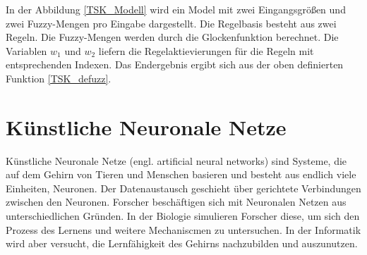 In der Abbildung \ref{TSK_Modell} wird ein Model mit zwei Eingangsgrößen und zwei Fuzzy-Mengen pro Eingabe dargestellt. Die Regelbasis besteht aus zwei Regeln. Die Fuzzy-Mengen werden durch die Glockenfunktion berechnet. Die Variablen $w_1$ und $w_2$ liefern die Regelaktievierungen für die Regeln mit entsprechenden Indexen. Das Endergebnis ergibt sich aus der oben definierten Funktion \ref{TSK_defuzz}.


%











\section{Künstliche Neuronale Netze} \label{ANN}

Künstliche Neuronale Netze (engl. artificial neural networks) sind Systeme, die auf dem Gehirn von Tieren und Menschen basieren und besteht aus endlich viele Einheiten, Neuronen. Der Datenaustausch geschieht über gerichtete Verbindungen zwischen den Neuronen. Forscher beschäftigen sich mit Neuronalen Netzen aus unterschiedlichen Gründen. In der Biologie simulieren Forscher diese, um sich den Prozess des Lernens und weitere Mechaniscmen zu untersuchen. In der Informatik wird aber versucht, die Lernfähigkeit des Gehirns nachzubilden und auszunutzen.

